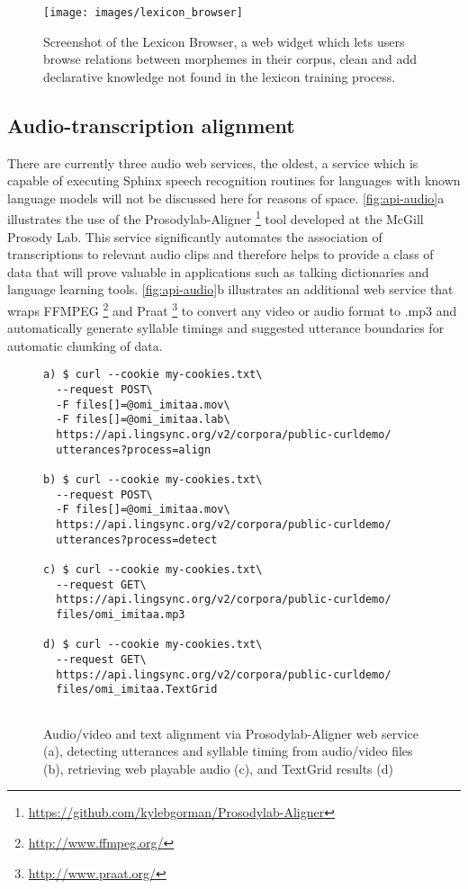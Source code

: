 \documentclass[11pt]{article}
\begin{document}
\begin{figure}
\begin{center}
\texttt{[image: images/lexicon\_browser]}
\caption{Screenshot of the Lexicon Browser, a web widget which lets users
browse relations between morphemes in their corpus, clean and add
declarative knowledge not found in the lexicon training process.}
\label{lexicon_browser_screenshot}
\end{center}
\end{figure}



\subsection{Audio-transcription alignment}
\label{sec:aligner}

There are currently three audio web services, the oldest, a service which is
capable of executing Sphinx speech recognition routines for languages with
known language models  will not be discussed here for reasons of space. 
\autoref{fig:api-audio}a illustrates the use of the Prosodylab-Aligner%
\footnote{\url{https://github.com/kylebgorman/Prosodylab-Aligner}} %
tool developed at the McGill Prosody Lab. This service significantly automates
the association of transcriptions to relevant audio clips and therefore helps
to provide a class of data that will prove valuable in applications such as
talking dictionaries and language learning tools. \autoref{fig:api-audio}b
illustrates an additional web service that wraps FFMPEG%
\footnote{\url{http://www.ffmpeg.org/}} %
and Praat%
\footnote{\url{http://www.praat.org/}} %
to convert any video or audio format to .mp3 and automatically generate
syllable timings and suggested utterance boundaries \cite{DeJong:2009} for
automatic chunking of data.


\begin{figure}[h]
\scriptsize
\begin{verbatim}
a) $ curl --cookie my-cookies.txt\
  --request POST\
  -F files[]=@omi_imitaa.mov\
  -F files[]=@omi_imitaa.lab\
  https://api.lingsync.org/v2/corpora/public-curldemo/
  utterances?process=align

b) $ curl --cookie my-cookies.txt\
  --request POST\
  -F files[]=@omi_imitaa.mov\
  https://api.lingsync.org/v2/corpora/public-curldemo/
  utterances?process=detect
  
c) $ curl --cookie my-cookies.txt\
  --request GET\
  https://api.lingsync.org/v2/corpora/public-curldemo/
  files/omi_imitaa.mp3
 
d) $ curl --cookie my-cookies.txt\
  --request GET\
  https://api.lingsync.org/v2/corpora/public-curldemo/
  files/omi_imitaa.TextGrid
   
\end{verbatim}
\caption{Audio/video and text alignment via Prosodylab-Aligner web service (a),
detecting utterances and syllable timing from audio/video files (b), retrieving
web playable audio (c), and TextGrid results (d)}
\normalsize
\label{fig:api-audio}
\end{figure}
\end{document}
